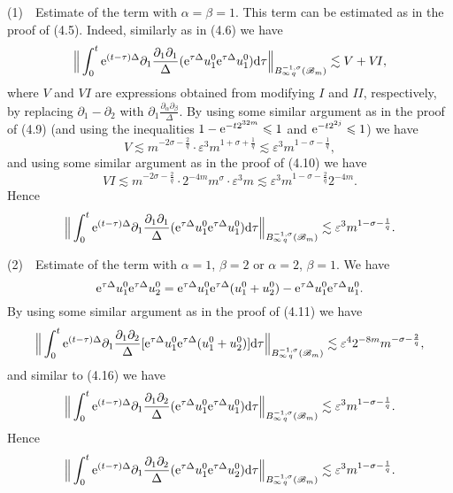 \documentclass[11pt]{article}
\newcommand{\rmd}{\mbox{\rm d}}
\newcommand{\rme}{{\rm e}}
\begin{document}
  (1)\ \ Estimate of the term with $\alpha=\beta=1$. This term can be estimated as in the proof of (4.5). Indeed, similarly as in (4.6) we have
$$
  \Big\|\int_0^t\rme^{(t-\tau)\Delta}\partial_1\frac{\partial_1\partial_1}{\Delta}
  (\rme^{\tau\Delta}u_1^0\rme^{\tau\Delta}u_1^0)\rmd\tau\Big\|_{B^{-1,\sigma}_{\infty\,q}(\mathscr{B}_m)}
  \lesssim V+V\!I,
$$
  where $V$ and $V\!I$ are expressions obtained from modifying $I$ and $I\!\!I$, respectively, by replacing $\partial_1-\partial_2$ with
  $\displaystyle\partial_1\frac{\partial_{\alpha}\partial_{\beta}}{\Delta}$. By using some similar argument as in the proof of (4.9) (and using
  the inequalities $1-\rme^{-t2^{32m}}\leqslant 1$ and $\rme^{-t2^{2j}}\leqslant 1$) we have
$$
  V\lesssim m^{-2\sigma-\frac{2}{q}}\cdot\varepsilon^3 m^{1+\sigma+\frac{1}{q}}\lesssim\varepsilon^3m^{1-\sigma-\frac{1}{q}},
$$
  and using some similar argument as in the proof of (4.10) we have
$$
  V\!I\lesssim m^{-2\sigma-\frac{2}{q}}\cdot 2^{-4m}m^{\sigma}\cdot\varepsilon^3 m
  \lesssim\varepsilon^3 m^{1-\sigma-\frac{2}{q}}2^{-4m}.
$$
  Hence
\begin{equation}
  \Big\|\int_0^t\rme^{(t-\tau)\Delta}\partial_1\frac{\partial_1\partial_1}{\Delta}
  (\rme^{\tau\Delta}u_1^0\rme^{\tau\Delta}u_1^0)\rmd\tau\Big\|_{B^{-1,\sigma}_{\infty\,q}(\mathscr{B}_m)}
  \lesssim\varepsilon^3 m^{1-\sigma-\frac{1}{q}}.
\end{equation}

  (2)\ \ Estimate of the term with $\alpha=1$, $\beta=2$ or $\alpha=2$, $\beta=1$. We have
$$
  \rme^{\tau\Delta}u_1^0\rme^{\tau\Delta}u_2^0=\rme^{\tau\Delta}u_1^0\rme^{\tau\Delta}(u_1^0+u_2^0)-\rme^{\tau\Delta}u_1^0\rme^{\tau\Delta}u_1^0.
$$
  By using some similar argument as in the proof of (4.11) we have
$$
  \Big\|\int_0^t\rme^{(t-\tau)\Delta}\partial_1\frac{\partial_1\partial_2}{\Delta}
  [\rme^{\tau\Delta}u_1^0\rme^{\tau\Delta}(u_1^0+u_2^0)]\rmd\tau\Big\|_{B^{-1,\sigma}_{\infty\,q}(\mathscr{B}_m)}
  \lesssim\varepsilon^4 2^{-8m}m^{-\sigma-\frac{2}{q}},
$$
  and similar to (4.16) we have
$$
  \Big\|\int_0^t\rme^{(t-\tau)\Delta}\partial_1\frac{\partial_1\partial_2}{\Delta}
  (\rme^{\tau\Delta}u_1^0\rme^{\tau\Delta}u_1^0)\rmd\tau\Big\|_{B^{-1,\sigma}_{\infty\,q}(\mathscr{B}_m)}
  \lesssim\varepsilon^3 m^{1-\sigma-\frac{1}{q}}.
$$
  Hence
\begin{equation}
  \Big\|\int_0^t\rme^{(t-\tau)\Delta}\partial_1\frac{\partial_1\partial_2}{\Delta}
  (\rme^{\tau\Delta}u_1^0\rme^{\tau\Delta}u_2^0)\rmd\tau\Big\|_{B^{-1,\sigma}_{\infty\,q}(\mathscr{B}_m)}
  \lesssim\varepsilon^3 m^{1-\sigma-\frac{1}{q}}.
\end{equation}
\end{document}
